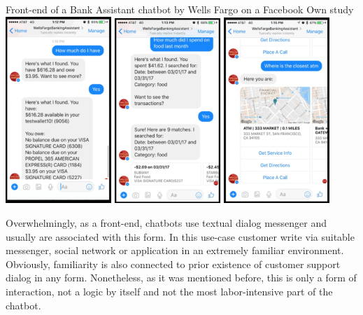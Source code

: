 \mtfigure
{Front-end of a Bank Assistant chatbot by Wells Fargo on a Facebook}
{Own study}
{
    \includegraphics[width=0.3\textwidth, keepaspectratio]{images/wells_fargo_bot_1.png}
    \includegraphics[width=0.3\textwidth, keepaspectratio]{images/wells_fargo_bot_2.png}
    \includegraphics[width=0.3\textwidth, keepaspectratio]{images/wells_fargo_bot_3.png}
}

Overwhelmingly, as a front-end, chatbots use textual dialog messenger and usually are associated with this form.
In this use-case customer write via suitable messenger, social network or application in an extremely familiar environment.
Obviously, familiarity is also connected to prior existence of customer support dialog in any form.
Nonetheless, as it was mentioned before, this is only a form of interaction, not a logic by itself and not the most labor-intensive part of the chatbot.


